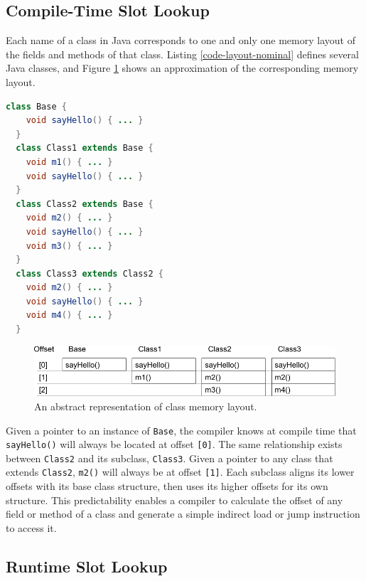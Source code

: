 \subsection{Compile-Time Slot Lookup}

Each name of a class in Java corresponds to one and only one memory layout of the fields and methods of that class.  Listing \ref{code-layout-nominal} defines several Java classes, and Figure \ref{fig:memory-layout-nominal} shows an approximation of the corresponding memory layout.

\begin{lstlisting}[language=Java,caption=Nominal type inheritance,label=code-layout-nominal]
  class Base {
    void sayHello() { ... }
  }
  class Class1 extends Base {
    void m1() { ... }
    void sayHello() { ... }
  }
  class Class2 extends Base {
    void m2() { ... }
    void sayHello() { ... }
    void m3() { ... }
  }
  class Class3 extends Class2 {
    void m2() { ... }
    void sayHello() { ... }
    void m4() { ... }
  }
\end{lstlisting}

\begin{figure}[htbp]
  \centering
    \includegraphics[width=\textwidth]{./Figures/memory-layout-nominal.pdf}
  \caption[Single Inheritance Memory Layout]{An abstract representation of class memory layout.}
	\label{fig:memory-layout-nominal}
\end{figure}

Given a pointer to an instance of \texttt{Base}, the compiler knows at compile time that \texttt{sayHello()} will always be located at offset \texttt{[0]}.  The same relationship exists between \texttt{Class2} and its subclass, \texttt{Class3}.  Given a pointer to any class that extends \texttt{Class2}, \texttt{m2()} will always be at offset \texttt{[1]}.  Each subclass aligns its lower offsets with its base class structure, then uses its higher offsets for its own structure.  This predictability enables a compiler to calculate the offset of any field or method of a class and generate a simple indirect load or jump instruction to access it.

\subsection{Runtime Slot Lookup}

